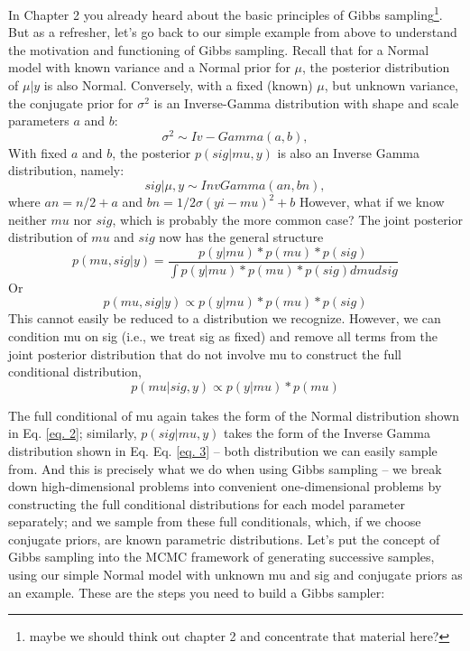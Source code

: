 In Chapter 2 you already heard about the basic principles of Gibbs
sampling\footnote{maybe we should think out chapter 2 and concentrate
  that material here?}. But as a refresher, let's go back to our
simple example from above to understand the motivation and functioning
of Gibbs sampling. Recall that for a Normal model with known variance
and a Normal prior for $\mu$, the posterior distribution of $\mu|y$ is also
Normal. Conversely, with a fixed (known) $\mu$, but unknown variance, the
conjugate prior for $\sigma^2$ is an Inverse-Gamma distribution with shape and scale parameters $a$ and $b$:
\[ 
\sigma^2 \sim Iv-Gamma(a,b),
\]
With fixed $a$ and $b$, the posterior $p(sig|mu,y)$ is also an Inverse Gamma distribution, namely:
\begin{equation}
sig|\mu,y \sim Inv Gamma (an, bn),						
\label{eq. 3}
\end{equation}
 where  $an = n/2   + a$ and $bn = 1/2 \sigma (yi-mu)^2+ b$
However, what if we know neither $mu$ nor $sig$, which is probably the more common case? The joint posterior distribution of $mu$ and $sig$ now has the general structure
\[
p(mu, sig|y) = \frac{p(y|mu)* p(mu) *p(sig)}{ \int p(y|mu)* p(mu) *p(sig) dmu dsig }
\]
Or
\[
p(mu, sig|y) \propto p(y|mu)* p(mu) *p(sig)
\]
This cannot easily be reduced to a distribution we recognize. However, we can condition mu on sig (i.e., we treat sig as fixed) and remove all terms from the joint posterior distribution that do not involve mu to construct the full conditional distribution, 
\[
p(mu|sig,y)  \propto p(y|mu)* p(mu) 
\]


The full conditional of mu again takes the form of the Normal distribution shown in Eq. \ref{eq. 2}; similarly, $p(sig|mu,y)$ takes the form of the Inverse Gamma distribution shown in Eq. Eq. \ref{eq. 3}  – both distribution we can easily sample from. And this is precisely what we do when using Gibbs sampling – we break down high-dimensional problems into convenient one-dimensional problems by constructing the full conditional distributions for each model parameter separately; and we sample from these full conditionals, which, if we choose conjugate priors, are known parametric distributions. 
Let's put the concept of Gibbs sampling into the MCMC framework of generating successive samples, using our simple Normal model with unknown mu and sig and conjugate priors as an example. These are the steps you need to build a Gibbs sampler:

